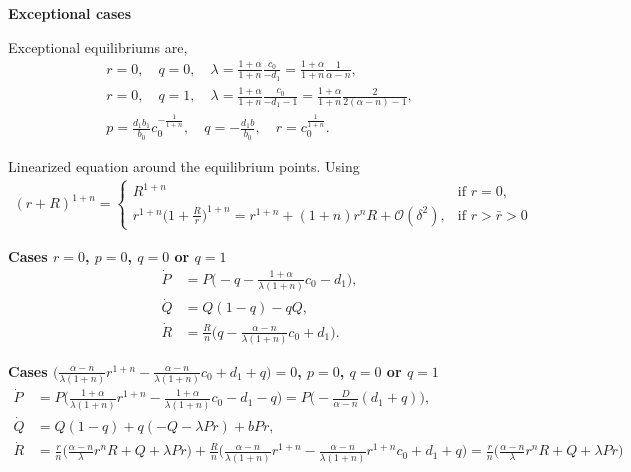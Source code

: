 \documentclass[a4paper,11pt]{article}
\begin{document}
\noindent
{\bf Exceptional cases}
\medskip

Exceptional equilibriums are,
\begin{align*}
 r=0, \quad q=0, \quad \lambda = \frac{1+\alpha}{1+n} \frac{c_0}{-d_1} = \frac{1+\alpha}{1+n} \frac{1}{\alpha-n},\\
 r=0, \quad q=1, \quad \lambda = \frac{1+\alpha}{1+n} \frac{c_0}{-d_1-1}= \frac{1+\alpha}{1+n} \frac{2}{2(\alpha-n)-1},\\
 p = \frac{d_1b_1}{b_0} c_0^{-\frac{1}{1+n}}, \quad q=-\frac{d_1 b}{b_0}, \quad r=c_0^{\frac{1}{1+n}}.
\end{align*}

Linearized equation around the equilibrium points. Using
\begin{align*}
 (r+R)^{1+n} = \begin{cases}
                R^{1+n} &\text{if $r=0$},\\
                r^{1+n}\Big(1+\frac{R}{r}\Big)^{1+n} = r^{1+n} + (1+n)r^nR + \mathcal{O}(\delta^2), & \text{if $r>\bar{r}>0$}
               \end{cases}
\end{align*}

\noindent
{\bf Cases $r=0$, $p=0$, $q=0$ or $q=1$}
\begin{align*}
 \dot{P} &=P\Big(-q-\frac{1+\alpha}{\lambda(1+n)} c_0 -d_1\Big),\\
 \dot{Q} &=Q(1-q) -qQ,\\
 \dot{R} &=\frac{R}{n}\Big(q-\frac{\alpha-n}{\lambda(1+n)} c_0 +d_1 \Big).
\end{align*}

\noindent
{\bf Cases $\Big( \frac{\alpha-n}{\lambda(1+n)} r^{1+n} - \frac{\alpha-n}{\lambda(1+n)}c_0 + d_1 + q \Big)=0$, $p=0$, $q=0$ or $q=1$}
\begin{align*}
 \dot{P}&=P\Big( \frac{1+\alpha}{\lambda(1+n)} r^{1+n} - \frac{1+\alpha}{\lambda(1+n)} c_0 -d_1-q\Big) = P\Big(-\frac{D}{\alpha-n}(d_1+q)\Big),\\
 \dot{Q}&=Q(1-q) +q(-Q-\lambda Pr) + bPr,\\
 \dot{R}&=\frac{r}{n}\Big( \frac{\alpha-n}{\lambda} r^nR + Q + \lambda Pr\Big) + \frac{R}{n}\Big(\frac{\alpha-n}{\lambda(1+n)}r^{1+n}-\frac{\alpha-n}{\lambda(1+n)}r^{1+n}c_0 + d_1 +q\Big) = \frac{r}{n}\Big( \frac{\alpha-n}{\lambda} r^nR + Q + \lambda Pr\Big)
\end{align*}
\end{document}
